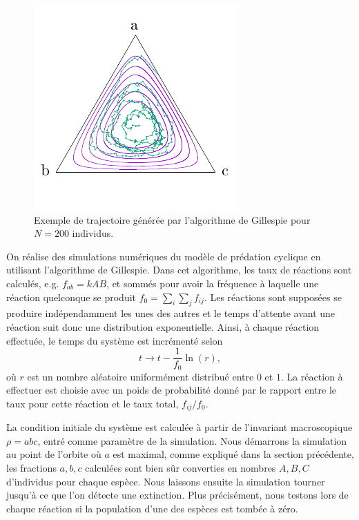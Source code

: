 \documentclass[openany,a4paper,12pt]{article}
\begin{document}
\begin{figure}[t]
	\centering
	\includegraphics[width=0.7\linewidth]{figures/portrait_trajectory}
	\caption{Exemple de trajectoire générée par l'algorithme de Gillespie pour $N=200$ individus.}
	\label{fig:portrait}
\end{figure}

\par On réalise des simulations numériques du modèle de prédation cyclique en utilisant l'algorithme de Gillespie. Dans cet algorithme, les taux de réactions sont calculés, e.g. $f_{ab} = k AB$, et sommés pour avoir la fréquence à laquelle une réaction quelconque se produit $f_0 = \sum_i\sum_j f_{ij}$. Les réactions sont supposées se produire indépendamment les unes des autres et le temps d'attente avant une réaction suit donc une distribution exponentielle. Ainsi, à chaque réaction effectuée, le temps du système est incrémenté selon
%
\begin{equation}\label{gillespie_incr_temps}
	t \rightarrow t - \frac{1}{f_0} \ln(r),
\end{equation}
%
où $r$ est un nombre aléatoire uniformément distribué entre $0$ et $1$.
La réaction à effectuer est choisie avec un poids de probabilité donné par le rapport entre le taux pour cette réaction et le taux total, $f_{ij}/f_0$.

\par La condition initiale du système est calculée à partir de l'invariant macroscopique $\rho=abc$, entré comme paramètre de la simulation. Nous démarrons la simulation au point de l'orbite où $a$ est maximal, comme expliqué dans la section précédente, les fractions $a,b,c$ calculées sont bien sûr converties en nombres $A,B,C$ d'individus pour chaque espèce. Nous laissons ensuite la simulation tourner jusqu'à ce que l'on détecte une extinction. Plus précisément, nous testons lors de chaque réaction si la population d'une des espèces est tombée à zéro.
\end{document}
